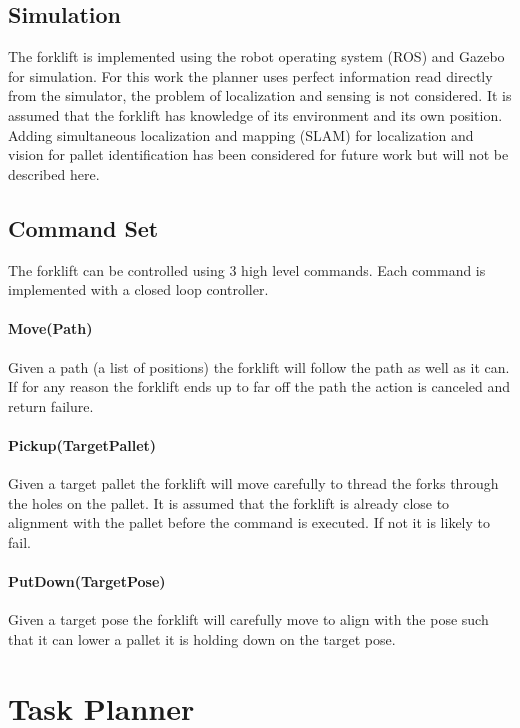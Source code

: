 \documentclass[letterpaper, 10 pt, conference]{ieeeconf}  %
\begin{document}
\subsection{Simulation}

The forklift is implemented using the robot operating system (ROS) and Gazebo for simulation. For this work the planner uses perfect information read directly from the simulator, the problem of localization and sensing is not considered. It is assumed that the forklift has knowledge of its environment and its own position. Adding simultaneous localization and mapping (SLAM) for localization and vision for pallet identification has been considered for future work but will not be described here.

\subsection{Command Set}

The forklift can be controlled using 3 high level commands. Each command is implemented with a closed loop controller.

\paragraph{Move(Path)} Given a path (a list of positions) the forklift will follow the path as well as it can. If for any reason the forklift ends up to far off the path the action is canceled and return failure. 

\paragraph{Pickup(TargetPallet)} Given a target pallet the forklift will move carefully to thread the forks through the holes on the pallet. It is assumed that the forklift is already close to alignment with the pallet before the command is executed. If not it is likely to fail.

\paragraph{PutDown(TargetPose)} Given a target pose the forklift will carefully move to align with the pose such that it can lower a pallet it is holding down on the target pose. 

\label{task_planner}
\section{Task Planner}
\end{document}
